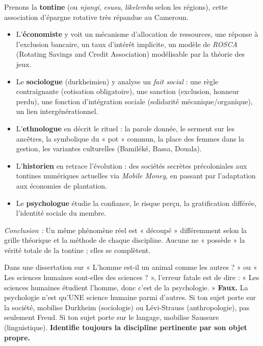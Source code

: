 \documentclass[11pt]{article}
\begin{document}
\begin{exemplebox}
Prenons la \textbf{tontine} (ou \emph{njangi}, \emph{esusu}, \emph{likelemba} selon les régions), cette association d'épargne rotative très répandue au Cameroun.
\begin{itemize}
    \item L'\textbf{économiste} y voit un mécanisme d'allocation de ressources, une réponse à l'exclusion bancaire, un taux d'intérêt implicite, un modèle de \emph{ROSCA} (Rotating Savings and Credit Association) modélisable par la théorie des jeux.
    \item Le \textbf{sociologue} (durkheimien) y analyse un \emph{fait social} : une règle contraignante (cotisation obligatoire), une sanction (exclusion, honneur perdu), une fonction d'intégration sociale (solidarité mécanique/organique), un lien intergénérationnel.
    \item L'\textbf{ethnologue} en décrit le rituel : la parole donnée, le serment sur les ancêtres, la symbolique du « pot » commun, la place des femmes dans la gestion, les variantes culturelles (Bamiléké, Bassa, Douala).
    \item L'\textbf{historien} en retrace l'évolution : des sociétés secrètes précoloniales aux tontines numériques actuelles via \emph{Mobile Money}, en passant par l'adaptation aux économies de plantation.
    \item Le \textbf{psychologue} étudie la confiance, le risque perçu, la gratification différée, l'identité sociale du membre.
\end{itemize}
\emph{Conclusion :} Un même phénomène réel est « découpé » différemment selon la grille théorique et la méthode de chaque discipline. Aucune ne « possède » la vérité totale de la tontine ; elles se complètent.
\end{exemplebox}

\begin{attention}
Dans une dissertation sur « L'homme est-il un animal comme les autres ? » ou « Les sciences humaines sont-elles des sciences ? », l'erreur fatale est de dire : « Les sciences humaines étudient l'homme, donc c'est de la psychologie. » \textbf{Faux.} La psychologie n'est qu'UNE science humaine parmi d'autres. Si ton sujet porte sur la société, mobilise Durkheim (sociologie) ou Lévi-Strauss (anthropologie), pas seulement Freud. Si ton sujet porte sur le langage, mobilise Saussure (linguistique). \textbf{Identifie toujours la discipline pertinente par son objet propre.}
\end{attention}
\end{document}
